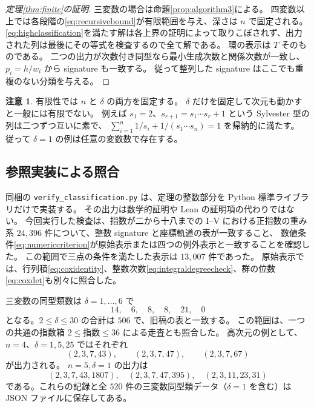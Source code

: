 \documentclass[11pt,a4paper]{ltjsarticle}
\numberwithin{equation}{section}
\theoremstyle{definition}
\newtheorem{remark}[theorem]{注意}
\begin{document}
\begin{proof}[定理\ref{thm:finite}の証明]
三変数の場合は命題\ref{prop:algorithm3}による。
四変数以上では各段階の\eqref{eq:recursivebound}が有限範囲を与え、深さは $n$ で固定される。
\eqref{eq:highclassification}を満たす解は各上界の証明によって取りこぼされず、出力された列は最後にその等式を検査するので全て解である。
環の表示は $T$ そのものである。
二つの出力が次数付き同型なら最小生成次数と関係次数が一致し、$p_i=h/w_i$ から signature も一致する。
従って整列した signature はここでも重複のない分類を与える。
\end{proof}
\begin{remark}
有限性では $n$ と $\delta$ の両方を固定する。
$\delta$ だけを固定して次元も動かすと一般には有限でない。
例えば $s_1=2$、$s_{r+1}=s_1\cdots s_r+1$ という Sylvester 型の列は二つずつ互いに素で、
$\sum_{i=1}^n1/s_i+1/(s_1\cdots s_n)=1$ を帰納的に満たす。
従って $\delta=1$ の例は任意の変数数で存在する。
\end{remark}

\subsection{参照実装による照合}
同梱の \texttt{verify\_classification.py} は、定理の整数部分を Python 標準ライブラリだけで実装する。
その出力は数学的証明や Lean の証明項の代わりではない。
今回実行した検査は、指数が二から十八までの I--V における正指数の重み系 $24{,}396$ 件について、整数 signature と座標軌道の表が一致すること、
数値条件\eqref{eq:numericcriterion}が原始表示または四つの例外表示と一致することを確認した。
この範囲で三点の条件を満たした表示は $13{,}007$ 件であった。
原始表示では、行列積\eqref{eq:coxidentity}、整数次数\eqref{eq:integraldegreecheck}、群の位数\eqref{eq:coxdet}も別々に照合した。

三変数の同型類数は $\delta=1,\dots,6$ で
\[
 14,\quad6,\quad8,\quad8,\quad21,\quad0
\]
となる。$2\le\delta\le30$ の合計は $506$ で、旧稿\cite{v04}の表と一致する。
この範囲は、一つの共通の指数箱 $2\le\text{指数}\le36$ による走査とも照合した。
高次元の例として、$n=4$、$\delta=1,5,25$ ではそれぞれ
\[
 (2,3,7,43),\qquad(2,3,7,47),\qquad(2,3,7,67)
\]
が出力される。
$n=5,\delta=1$ の出力は
\[
 (2,3,7,43,1807),\quad(2,3,7,47,395),\quad(2,3,11,23,31)
\]
である。これらの記録と全 $520$ 件の三変数同型類データ（$\delta=1$ を含む）は JSON ファイルに保存してある。
\end{document}
